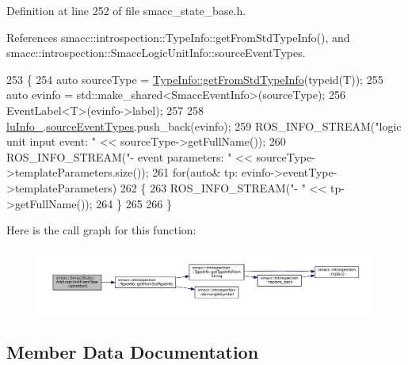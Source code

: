 Definition at line 252 of file smacc\+\_\+state\+\_\+base.\+h.



References smacc\+::introspection\+::\+Type\+Info\+::get\+From\+Std\+Type\+Info(), and smacc\+::introspection\+::\+Smacc\+Logic\+Unit\+Info\+::source\+Event\+Types.


\begin{DoxyCode}
253     \{
254       \textcolor{keyword}{auto} sourceType = \hyperlink{classsmacc_1_1introspection_1_1TypeInfo_ada1e604cd8bf968a5f816fbace4af881}{TypeInfo::getFromStdTypeInfo}(\textcolor{keyword}{typeid}(T));
255       \textcolor{keyword}{auto} evinfo = std::make\_shared<SmaccEventInfo>(sourceType);
256       EventLabel<T>(evinfo->label);
257 
258       \hyperlink{structsmacc_1_1SmaccState_1_1AddLogicUnitEventType_a31c27ea945cd0127080c0bae872c028e}{luInfo\_}.\hyperlink{structsmacc_1_1introspection_1_1SmaccLogicUnitInfo_add386e83d888a7819c0132a75942fa5d}{sourceEventTypes}.push\_back(evinfo);
259       ROS\_INFO\_STREAM(\textcolor{stringliteral}{"logic unit input event: "} << sourceType->getFullName());
260       ROS\_INFO\_STREAM(\textcolor{stringliteral}{"- event parameters: "} << sourceType->templateParameters.size());
261       \textcolor{keywordflow}{for}(\textcolor{keyword}{auto}& tp: evinfo->eventType->templateParameters)
262       \{
263         ROS\_INFO\_STREAM(\textcolor{stringliteral}{"- "} << tp->getFullName());
264       \}
265 
266     \}
\end{DoxyCode}


Here is the call graph for this function\+:
\nopagebreak
\begin{figure}[H]
\begin{center}
\leavevmode
\includegraphics[width=350pt]{structsmacc_1_1SmaccState_1_1AddLogicUnitEventType_a8ed7e96e4922fbc8097a6ff078d70150_cgraph}
\end{center}
\end{figure}




\subsection{Member Data Documentation}
